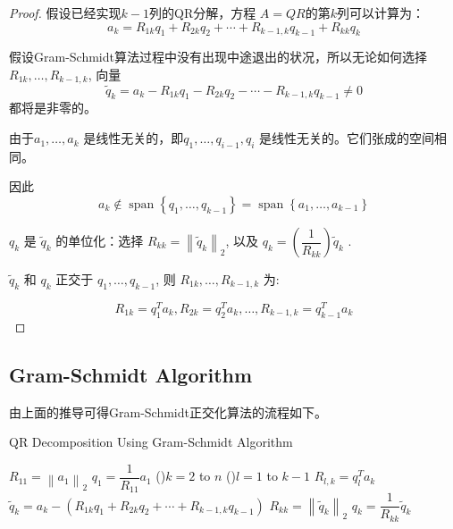 \begin{proof}


    假设已经实现$k - 1$列的QR分解，方程 $A= QR$的第$k$列可以计算为：
\begin{equation}
a_{k}=R_{1 k} q_{1}+R_{2 k} q_{2}+\cdots+R_{k-1, k} q_{k-1}+R_{k k} q_{k}
\end{equation}

假设Gram-Schmidt算法过程中没有出现中途退出的状况，所以无论如何选择 $R_{1 k}, \ldots, R_{k-1, k}$, 向量
\begin{equation}
\tilde{q}_{k}=a_{k}-R_{1 k} q_{1}-R_{2 k} q_{2}-\cdots-R_{k-1, k} q_{k-1} \neq 0
\end{equation}
都将是非零的。

由于$a_{1}, \ldots, a_{k}$ 是线性无关的，即$q_{1}, \ldots, q_{i-1}, q_{i} $ 是线性无关的。它们张成的空间相同。

因此
\begin{equation}
a_{k} \notin \operatorname{span}\left\{q_{1}, \ldots, q_{k-1}\right\}=\operatorname{span}\left\{a_{1}, \ldots, a_{k-1}\right\}
\end{equation}

$q_{k}$ 是 $\tilde{q}_{k}$ 的单位化：选择 $R_{k k}=\left\|\tilde{q}_{k}\right\|_{2}$, 以及 $q_{k}=\left(\dfrac{1}{R_{kk}} \right) \tilde{q}_{k}$ . 

$\tilde{q}_{k}$ 和 $q_{k}$ 正交于 $q_{1}, \ldots, q_{k-1}$, 则 $R_{1 k}, \ldots, R_{k-1, k}$ 为:

\begin{equation}R_{1 k}=q_{1}^{T} a_{k},  R_{2 k}=q_{2}^{T} a_{k}, \ldots,  R_{k-1, k}=q_{k-1}^{T} a_{k}\end{equation}
\end{proof}

\subsection{Gram-Schmidt Algorithm}

由上面的推导可得Gram-Schmidt正交化算法的流程如下。

\begin{algorithm}[htbp]
    \caption{QR Decomposition Using Gram-Schmidt Algorithm}


    $R_{11}=\left\|a_{1}\right\|_{2}$ \;
     $q_{1}=\dfrac{1}{R_{11}} a_{1}$ \;
\For(){$k=2$ to $n$}{
    \For(){$l=1$ to $k-1$}{
$R_{l, k} =q_{l}^{T} a_{k}$ \;}
$\tilde{q}_{k} =a_{k}-\left(R_{1 k} q_{1}+R_{2 k} q_{2}+\cdots+R_{k-1, k} q_{k-1}\right)$ \;
$R_{k k} =\left\|\tilde{q}_{k}\right\|_{2}$ \;
 $q_{k} =\dfrac{1}{R_{k k}} \tilde{q}_{k}$ \;
}
\end{algorithm}


